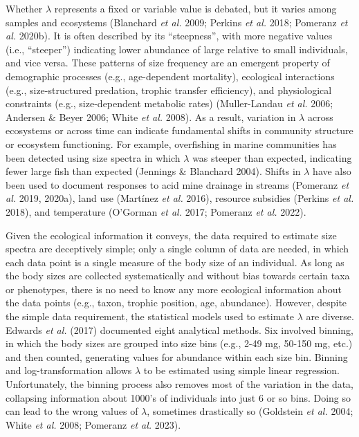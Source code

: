 \documentclass[
  12pt,
]{article}
\begin{document}
Whether \(\lambda\) represents a fixed or variable value is debated, but
it varies among samples and ecosystems (Blanchard \emph{et al.} 2009;
Perkins \emph{et al.} 2018; Pomeranz \emph{et al.} 2020b). It is often
described by its ``steepness'', with more negative values (i.e.,
``steeper'') indicating lower abundance of large relative to small
individuals, and vice versa. These patterns of size frequency are an
emergent property of demographic processes (e.g., age-dependent
mortality), ecological interactions (e.g., size-structured predation,
trophic transfer efficiency), and physiological constraints (e.g.,
size-dependent metabolic rates) (Muller-Landau \emph{et al.} 2006;
Andersen \& Beyer 2006; White \emph{et al.} 2008). As a result,
variation in \(\lambda\) across ecosystems or across time can indicate
fundamental shifts in community structure or ecosystem functioning. For
example, overfishing in marine communities has been detected using size
spectra in which \(\lambda\) was steeper than expected, indicating fewer
large fish than expected (Jennings \& Blanchard 2004). Shifts in
\(\lambda\) have also been used to document responses to acid mine
drainage in streams (Pomeranz \emph{et al.} 2019, 2020a), land use
(Martínez \emph{et al.} 2016), resource subsidies (Perkins \emph{et al.}
2018), and temperature (O'Gorman \emph{et al.} 2017; Pomeranz \emph{et
al.} 2022).

Given the ecological information it conveys, the data required to
estimate size spectra are deceptively simple; only a single column of
data are needed, in which each data point is a single measure of the
body size of an individual. As long as the body sizes are collected
systematically and without bias towards certain taxa or phenotypes,
there is no need to know any more ecological information about the data
points (e.g., taxon, trophic position, age, abundance). However, despite
the simple data requirement, the statistical models used to estimate
\(\lambda\) are diverse. Edwards \emph{et al.} (2017) documented eight
analytical methods. Six involved binning, in which the body sizes are
grouped into size bins (e.g., 2-49 mg, 50-150 mg, etc.) and then
counted, generating values for abundance within each size bin. Binning
and log-transformation allows \(\lambda\) to be estimated using simple
linear regression. Unfortunately, the binning process also removes most
of the variation in the data, collapsing information about 1000's of
individuals into just 6 or so bins. Doing so can lead to the wrong
values of \(\lambda\), sometimes drastically so (Goldstein \emph{et al.}
2004; White \emph{et al.} 2008; Pomeranz \emph{et al.} 2023).
\end{document}
